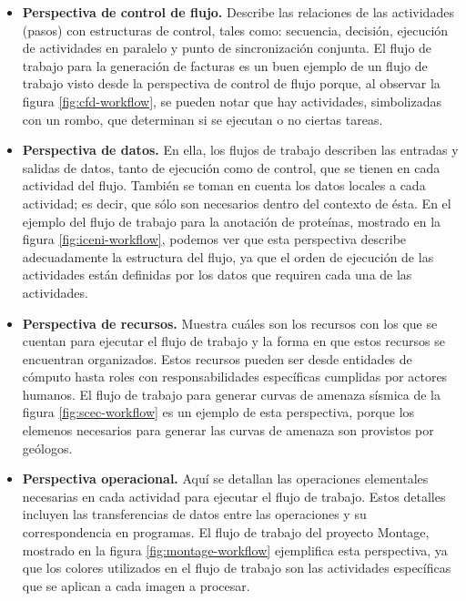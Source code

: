 \begin{itemize}
\item{\textbf{Perspectiva de control de flujo.} Describe las relaciones de las actividades (pasos) con estructuras de control, tales como: secuencia, decisión, ejecución de actividades en paralelo y punto de sincronización conjunta. El flujo de trabajo para la generación de facturas es un buen ejemplo de un flujo de trabajo visto desde la perspectiva de control de flujo porque, al observar la figura \ref{fig:cfd-workflow}, se pueden notar que hay actividades, simbolizadas con un rombo, que determinan si se ejecutan o no ciertas tareas.
}

\item{\textbf{Perspectiva de datos.} En ella, los flujos de trabajo describen las entradas y salidas de datos, tanto de ejecución como de control, que se tienen en cada actividad del flujo. También se toman en cuenta los datos locales a cada actividad; es decir, que sólo son necesarios dentro del contexto de ésta. En el ejemplo del flujo de trabajo para la anotación de proteínas, mostrado en la figura \ref{fig:iceni-workflow}, podemos ver que esta perspectiva describe adecuadamente la estructura del flujo, ya que el orden de ejecución de las actividades están definidas por los datos que requiren cada una de las actividades.}

\item{\textbf{Perspectiva de recursos.} Muestra cuáles son los recursos con los que se cuentan para ejecutar el flujo de trabajo y la forma en que estos recursos se encuentran organizados. Estos recursos pueden ser desde entidades de cómputo hasta roles con responsabilidades específicas cumplidas por actores humanos. El flujo de trabajo para generar curvas de amenaza sísmica de la figura \ref{fig:scec-workflow} es un ejemplo de esta perspectiva, porque los elemenos necesarios para generar las curvas de amenaza son provistos por geólogos.}

\item{\textbf{Perspectiva operacional.} Aquí se detallan las operaciones elementales necesarias en cada actividad para ejecutar el flujo de trabajo. Estos detalles incluyen las transferencias de datos entre las operaciones y su correspondencia en programas. El flujo de trabajo del proyecto Montage, mostrado en la figura \ref{fig:montage-workflow} ejemplifica esta perspectiva, ya que los colores utilizados en el flujo de trabajo son las actividades específicas que se aplican a cada imagen a procesar.}
\end{itemize}

